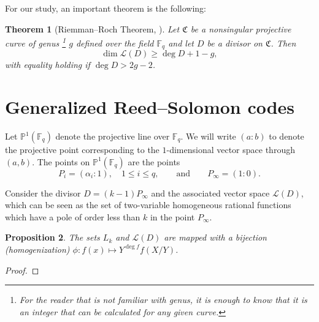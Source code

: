 \documentclass[11pt, oneside]{amsart}
\newtheorem{thm}{Theorem}[section]
\newtheorem{prop}[thm]{Proposition}
\theoremstyle{definition}
\theoremstyle{remark}
\numberwithin{equation}{section}
\begin{document}
For our study, an important theorem is the following:
\begin{thm}[Riemman--Roch Theorem, \cite{Wal00}]
	Let $\mathfrak C$ be a nonsingular projective curve of genus%
	\footnote{For the reader that is not familiar with genus, it is enough to know that it is an integer that can be calculated for any given curve.}
	$g$ defined over the field $\mathbb{F}_q$ and let $D$ be a divisor on $\mathfrak C$.
	Then
	\begin{equation}
		\dim \mathcal L(D) \ge \deg D + 1 - g,
	\end{equation}
	with equality holding if $\deg D > 2g - 2$.
\end{thm}


\section{Generalized Reed--Solomon codes} \label{s:grs}
Let $\mathbb{P}^1(\mathbb{F}_q)$ denote the projective line over $\mathbb{F}_q$.
We will write $(a : b)$ to denote the projective point corresponding to the $1$-dimensional vector space through $(a, b)$.
The points on $\mathbb{P}^1(\mathbb{F}_q)$ are the points
\begin{equation}
	P_i = (\alpha_i : 1), \quad 1 \le i \le q, \qquad \text{and} \qquad 
	P_\infty = (1 : 0).
\end{equation}

Consider the divisor $D = (k-1)P_\infty$ and the associated vector space $\mathcal L(D)$, which can be seen as the set of two-variable homogeneous rational functions which have a pole of order less than $k$ in the point $P_\infty$.

\begin{prop}
	The sets $L_k$ and $\mathcal L(D)$ are mapped with a bijection (homogenization) $\phi: f(x) \mapsto Y^{\deg f} f(X/Y)$.
\end{prop}
\begin{proof}
\end{proof}
\end{document}
